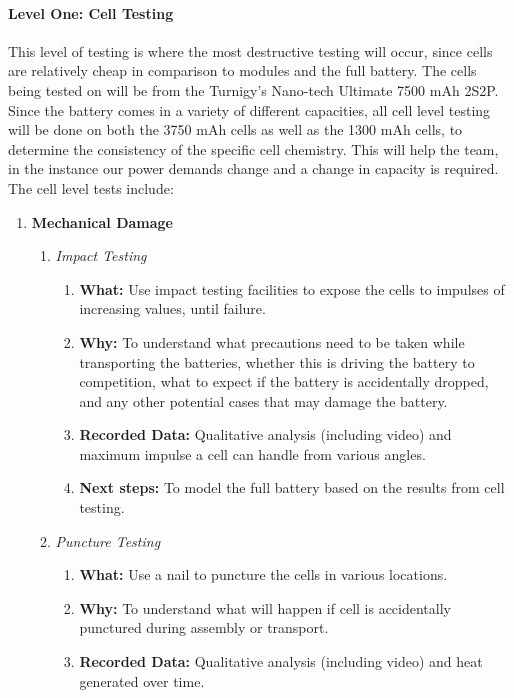\documentclass[main.tex]{subfile}
\begin{document}
    \paragraph{Level One: Cell Testing}
    This level of testing is where the most destructive testing will occur, since cells are relatively cheap in comparison to modules and the full battery. The cells being tested on will be from the Turnigy’s Nano-tech Ultimate  7500 mAh 2S2P. Since the battery comes in a variety of different capacities, all cell level testing will be done on both the 3750 mAh cells as well as the 1300 mAh cells, to determine the consistency of the specific cell chemistry. This will help the team, in the instance our power demands change and a change in capacity is required. The cell level tests include:
    \begin{enumerate}
        \item \textbf{Mechanical Damage}
        \begin{enumerate}
            \item \textit{Impact Testing}
            \begin{enumerate}
                \item \textbf{What: }Use impact testing facilities to expose the cells to impulses of increasing values, until failure.
                \item \textbf{Why: }To understand what precautions need to be taken while transporting the batteries, whether this is driving the battery to competition, what to expect if the battery is accidentally dropped, and any other potential cases that may damage the battery.
                \item \textbf{Recorded Data: }Qualitative analysis (including video) and maximum impulse a cell can handle from various angles.
                \item \textbf{Next steps: }To model the full battery based on the results from cell testing.
            \end{enumerate}
            \item \textit{Puncture Testing}
            \begin{enumerate}
                \item \textbf{What: }Use a nail to puncture the cells in various locations.
                \item \textbf{Why: }To understand what will happen if cell is accidentally punctured during assembly or transport.
                \item \textbf{Recorded Data: }Qualitative analysis (including video) and heat generated over time.

\end{enumerate}
\end{enumerate}
\end{enumerate}
\end{document}
